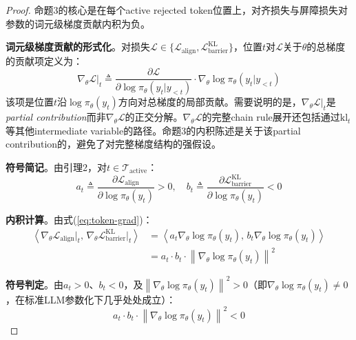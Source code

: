 \documentclass[lettersize,journal]{IEEEtran}
\begin{document}
\begin{proof}
命题3的核心是在每个active rejected token位置上，对齐损失与屏障损失对参数的词元级梯度贡献内积为负。

\textbf{词元级梯度贡献的形式化}。对损失$\mathcal{L} \in \{\mathcal{L}_{\text{align}}, \mathcal{L}^{\text{KL}}_{\text{barrier}}\}$，位置$t$对$\mathcal{L}$关于$\theta$的总梯度的贡献项定义为：
\begin{equation}\label{eq:token-grad}
\nabla_\theta \mathcal{L}\big|_t \triangleq \frac{\partial \mathcal{L}}{\partial \log\pi_\theta(y_t|y_{<t})} \cdot \nabla_\theta \log\pi_\theta(y_t|y_{<t})
\end{equation}
该项是位置$t$沿$\log\pi_\theta(y_t)$方向对总梯度的局部贡献。需要说明的是，$\nabla_\theta \mathcal{L}|_t$是\textit{partial contribution}而非$\nabla_\theta \mathcal{L}$的正交分解。$\nabla_\theta \mathcal{L}$的完整chain rule展开还包括通过$\text{kl}_t$等其他intermediate variable的路径。命题3的内积陈述是关于该partial contribution的，避免了对完整梯度结构的强假设。

\textbf{符号简记}。由引理2，对$t \in \mathcal{T}_{\text{active}}$：
\begin{equation}
a_t \triangleq \frac{\partial \mathcal{L}_{\text{align}}}{\partial \log\pi_\theta(y_t)} > 0, \quad b_t \triangleq \frac{\partial \mathcal{L}^{\text{KL}}_{\text{barrier}}}{\partial \log\pi_\theta(y_t)} < 0
\end{equation}

\textbf{内积计算}。由式(\ref{eq:token-grad})：
\begin{equation}
\begin{aligned}
\left\langle \nabla_\theta \mathcal{L}_{\text{align}}\big|_t,\, \nabla_\theta \mathcal{L}^{\text{KL}}_{\text{barrier}}\big|_t \right\rangle 
&= \left\langle a_t \nabla_\theta \log\pi_\theta(y_t),\, b_t \nabla_\theta \log\pi_\theta(y_t) \right\rangle \\
&= a_t \cdot b_t \cdot \left\|\nabla_\theta \log\pi_\theta(y_t)\right\|^2
\end{aligned}
\end{equation}

\textbf{符号判定}。由$a_t > 0$、$b_t < 0$，及$\left\|\nabla_\theta \log\pi_\theta(y_t)\right\|^2 > 0$（即$\nabla_\theta \log\pi_\theta(y_t) \neq 0$，在标准LLM参数化下几乎处处成立）：
\begin{equation}
a_t \cdot b_t \cdot \left\|\nabla_\theta \log\pi_\theta(y_t)\right\|^2 < 0
\end{equation}
\end{proof}
\end{document}
